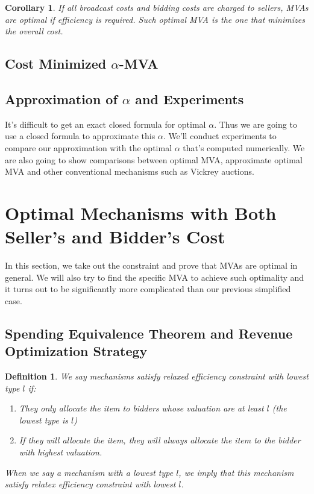 \documentclass{aamas2012}
\newtheorem{definition}{Definition}
\newtheorem{corollary}{Corollary}
\begin{document}
\begin{corollary}

If all broadcast costs and bidding costs are charged to sellers, MVAs are
optimal if efficiency is required.  Such optimal MVA is the one that minimizes
the overall cost.

\end{corollary}

\subsection{Cost Minimized $\alpha$-MVA}

\subsection{Approximation of $\alpha$ and Experiments}

It's difficult to get an exact closed formula for optimal $\alpha$. Thus we are
going to use a closed formula to approximate this $\alpha$. We'll conduct
experiments to compare our approximation with the optimal $\alpha$ that's
computed numerically. We are also going to show comparisons between optimal
MVA, approximate optimal MVA and other conventional mechanisms such as Vickrey
auctions.

\section{Optimal Mechanisms with Both Seller's and Bidder's Cost}

In this section, we take out the constraint and prove that MVAs are optimal in
general. We will also try to find the specific MVA to achieve such optimality
and it turns out to be significantly more complicated than our previous
simplified case.

\subsection{Spending Equivalence Theorem and Revenue Optimization Strategy}

\begin{definition}

We say mechanisms satisfy relaxed efficiency constraint with lowest type $l$
if:

    \begin{enumerate}

    \item They only allocate the item to bidders whose valuation are at least
    $l$ (the lowest type is $l$)

    \item If they will allocate the item, they will always allocate the item to
    the bidder with highest valuation.

    \end{enumerate}

When we say a mechanism with a lowest type $l$, we imply that this mechanism
satisfy relatex efficiency constraint with lowest $l$.

\end{definition}
\end{document}
